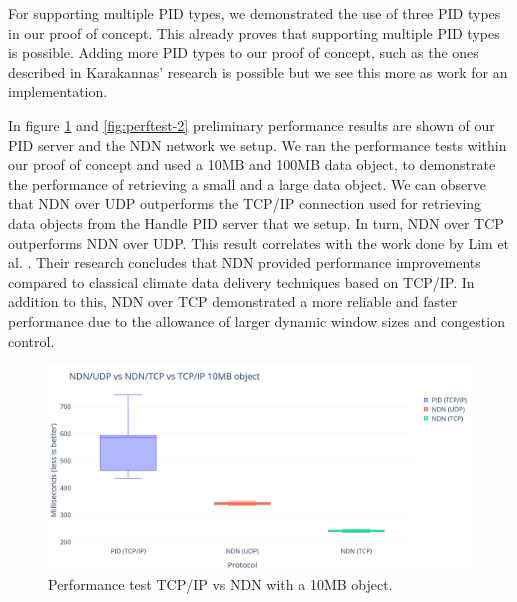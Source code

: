 For supporting multiple PID types, we demonstrated the use of three PID types in our proof of concept. This already proves that supporting multiple PID types is possible. Adding more PID types to our proof of concept, such as the ones described in Karakannas' research \cite{icn-bd} is possible but we see this more as work for an implementation.


In figure \ref{fig:perftest-1} and \ref{fig:perftest-2} preliminary performance results are shown of our PID server and the NDN network we setup. We ran the performance tests within our proof of concept and used a 10MB and 100MB data object, to demonstrate the performance of retrieving a small and a large data object. We can observe that NDN over UDP outperforms the TCP/IP connection used for retrieving data objects from the Handle PID server that we setup. In turn, NDN over TCP outperforms NDN over UDP. This result correlates with the work done by Lim et al. \cite{lim2018ndn}. Their research concludes that NDN provided performance improvements compared to classical climate data delivery techniques based on TCP/IP. In addition to this, NDN over TCP demonstrated a more reliable and faster performance due to the allowance of larger dynamic window sizes and congestion control.

\begin{figure}[H]
\centering
\includegraphics[scale=0.3]{Images/bench10MB.png}
\caption{Performance test TCP/IP vs NDN with a 10MB object.}
\label{fig:perftest-1}
\end{figure}

